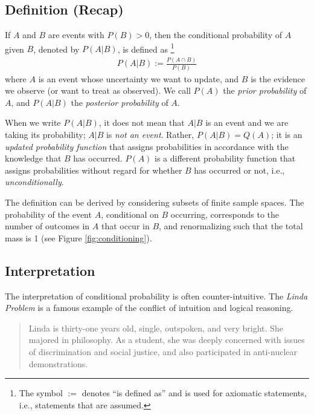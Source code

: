 \subsection{Definition (Recap)}

If \(A\) and \(B\) are events with \(P(B) > 0\), 
then the conditional probability of \(A\) given \(B\), 
denoted by \(P(A|B)\), 
is defined as%
\footnote{The symbol \(:=\) denotes ``is defined as'' and is used for axiomatic statements, i.e., statements that are assumed.}
\begin{align}
P\left( A | B \right) := \frac{P(A \cap B)}{P(B)}
\end{align}
where \(A\) is an event whose uncertainty we want to update, and \(B\)
is the evidence we observe (or want to treat as observed). We call
\(P(A)\) the \emph{prior probability} of \(A\), and \(P(A|B)\) the
\emph{posterior probability} of \(A\).

When we write \(P(A|B)\), 
it does not mean that \(A|B\) is an event and we are taking its probability; 
\(A|B\) is \emph{not an event}. 
Rather,
\(P\left( A | B \right) = Q(A)\);
it is an \emph{updated probability function} 
that assigns probabilities in accordance with the knowledge that \(B\) has occurred.
\(P(A)\) is a different probability function that assigns probabilities 
without regard for whether \(B\) has occurred or not, 
i.e., \emph{unconditionally}.

The definition can be derived by considering subsets 
of finite sample spaces. 
The probability of the event \(A\), 
conditional on \(B\) occurring, 
corresponds to the number of outcomes in \(A\) that occur in \(B\), 
and renormalizing such that the total mass is 1 (see Figure \ref{fig:conditioning}).

\subsection{Interpretation}

The interpretation of conditional probability is often counter-intuitive. 
The \emph{Linda Problem} is a famous example of 
the conflict of intuition and logical reasoning.

\begin{quote}
Linda is thirty-one years old, single, outspoken, and very bright. 
She majored in philosophy. 
As a student, 
she was deeply
concerned with issues of discrimination and social justice, 
and also participated in anti-nuclear demonstrations.
\end{quote}

